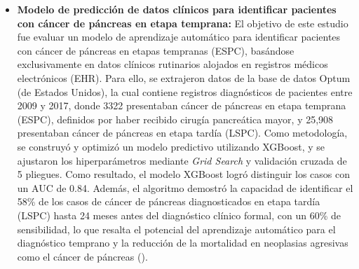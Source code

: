 \begin{itemize}
\item \textbf{Modelo de predicción de datos clínicos para identificar pacientes con cáncer de páncreas en etapa temprana:} El objetivo de este estudio fue evaluar un modelo de aprendizaje automático para identificar pacientes con cáncer de páncreas en etapas tempranas (ESPC), basándose exclusivamente en datos clínicos rutinarios alojados en registros médicos electrónicos (EHR). Para ello, se extrajeron datos de la base de datos Optum (de Estados Unidos), la cual contiene registros diagnósticos de pacientes entre 2009 y 2017, donde 3322 presentaban cáncer de páncreas en etapa temprana (ESPC), definidos por haber recibido cirugía pancreática mayor, y 25,908 presentaban cáncer de páncreas en etapa tardía (LSPC). Como metodología, se construyó y optimizó un modelo predictivo utilizando XGBoost, y se ajustaron los hiperparámetros mediante \textit{Grid Search} y validación cruzada de 5 pliegues. Como resultado, el modelo XGBoost logró distinguir los casos con un AUC de 0.84. Además, el algoritmo demostró la capacidad de identificar el 58\% de los casos de cáncer de páncreas diagnosticados en etapa tardía (LSPC) hasta 24 meses antes del diagnóstico clínico formal, con un 60\% de sensibilidad, lo que resalta el potencial del aprendizaje automático para el diagnóstico temprano y la reducción de la mortalidad en neoplasias agresivas como el cáncer de páncreas (\cite{article10}).

\end{itemize}
